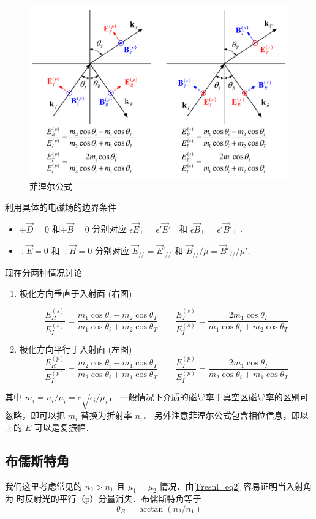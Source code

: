 
\begin{figure}[ht]
\centering
\includegraphics[width=14cm]{./figures/Fresnl.pdf}
\caption{菲涅尔公式} \label{Sample_fig1}
\end{figure}
 
利用具体的电磁场的边界条件 %
\begin{itemize}
\item $\div \vec D = 0$ 和$\div \vec B = 0$  分别对应 $\epsilon \vec E_\bot = \epsilon' \vec E'_\bot$ 和 $\epsilon \vec B_\bot = \epsilon' \vec B'_\bot$ .

\item $\div \vec E = 0$ 和 $\div \vec H = 0$ 分别对应 $\vec E_{//} = \vec E'_{//}$ 和 $\vec B_{//}/\mu = \vec B'_{//}/\mu'$.
\end{itemize}

现在分两种情况讨论
\begin{enumerate}
\item 极化方向垂直于入射面 (右图)

\begin{equation}
\frac{E_R^{(s)}}{E_I^{(s)}} =  \frac{m_1\cos{\theta_i} - m_2\cos\theta_T}{m_1\cos\theta_i + m_2\cos\theta_T}
\qquad
\frac{E_T^{(s)}}{E_I^{(s)}} = \frac{2 m_1\cos\theta_I}{m_1\cos\theta_i + m_2\cos\theta_T}
\end{equation}

\item 极化方向平行于入射面 (左图)
\begin{equation}\label{Fresnl_eq2}
\frac{E_R^{(p)}}{E_I^{(p)}} =  \frac{m_2\cos\theta_i - m_1\cos\theta_T}{m_2 \cos\theta_i + m_1\cos\theta_T}
\qquad
\frac{E_T^{(p)}}{E_I^{(p)}} =  \frac{2 m_1\cos\theta_I}{m_2\cos\theta_i + m_1\cos\theta_T}
\end{equation}
\end{enumerate}
其中 $m_i=n_i/\mu_i = c\sqrt{\epsilon_i/\mu_i}$， 一般情况下介质的磁导率于真空区磁导率的区别可忽略，即可以把 $m_i$ 替换为折射率 $n_i$． 另外注意菲涅尔公式包含相位信息，即以上的 $E$ 可以是复振幅．

\subsection{布儒斯特角}
我们这里考虑常见的 $n_2>n_1$ 且 $\mu_1 = \mu_2$ 情况．由\autoref{Fresnl_eq2} 容易证明当入射角为 时反射光的平行（p）分量消失．布儒斯特角等于
\begin{equation}
\theta_B = \arctan (n_2/n_1)
\end{equation}
